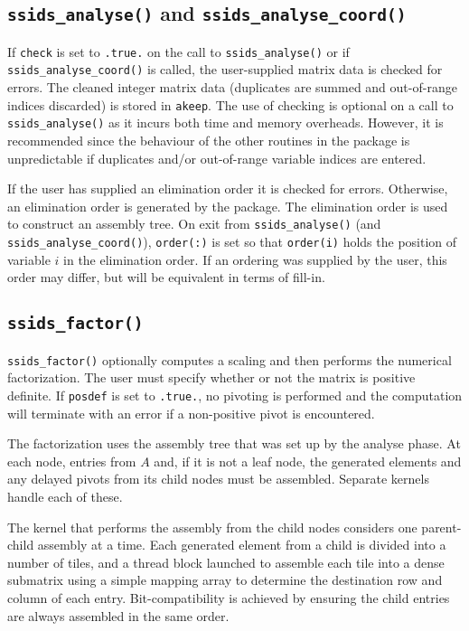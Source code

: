 \subsection*{\texttt{ssids\_analyse()} and \texttt{ssids\_analyse\_coord()}}
If {\tt check} is set to {\tt .true.} on the call to {\tt ssids\_analyse()}
or if {\tt ssids\_analyse\_coord()} is called, 
the user-supplied matrix data is checked for errors. The cleaned integer matrix data
(duplicates are summed and out-of-range indices discarded) is stored in
{\tt akeep}.
The use of checking is optional on a call to {\tt ssids\_analyse()} as it
incurs both time and memory overheads. However, it is recommended
since the behaviour of the other routines in the package
is unpredictable if duplicates and/or out-of-range variable indices are entered.

If the user has supplied an elimination order it is checked for errors. Otherwise,
an elimination order is generated by the package. 
The elimination order is used to construct an assembly tree.
On exit from {\tt ssids\_analyse()} (and {\tt ssids\_analyse\_coord()}), 
{\tt order(:)} is set so that {\tt order(i)} holds the position
of variable $i$ in the elimination order. If an ordering was supplied by the user, this
order may differ, but will be equivalent in terms of fill-in.


\subsection*{\texttt{ssids\_factor()}}
{\tt ssids\_factor()} optionally computes a scaling and then performs the numerical factorization.
 The user must specify whether or not the matrix is
positive definite. If {\tt posdef} is set to {\tt .true.}, no pivoting
is performed and the computation will terminate with an error if a
non-positive pivot is encountered.

The factorization uses the assembly tree that was set up by the analyse phase.
At each  node,  entries from $A$ and, if it is not a leaf node,
the generated elements and any delayed pivots from its child nodes
must be assembled. Separate kernels handle each of these.


The kernel that performs the assembly from the child nodes considers one parent-child
assembly at a time. Each  generated element from a child is divided into a number of
tiles, and a thread block launched to assemble each tile into a 
dense submatrix using a simple
mapping array to determine the destination row and column of each entry.
Bit-compatibility is achieved by ensuring the child entries are
always assembled in the same order. 

